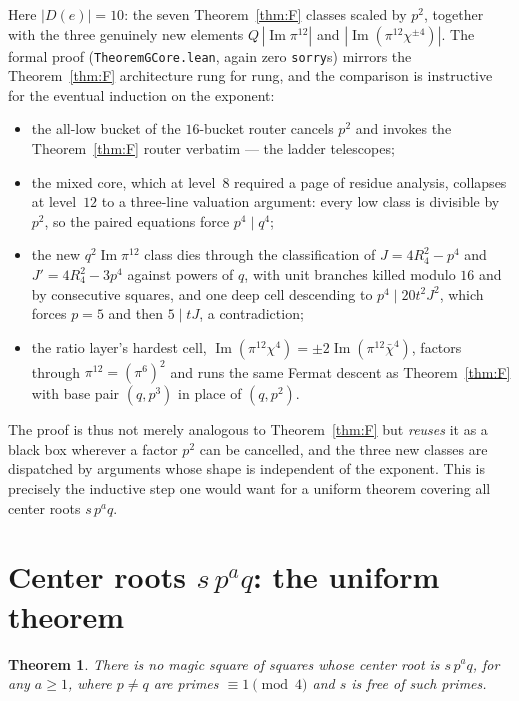 \documentclass[11pt]{article}
\newtheorem{theorem}{Theorem}
\theoremstyle{remark}
\DeclareMathOperator{\im}{Im}
\begin{document}
Here $|D(e)|=10$: the seven Theorem~\ref{thm:F} classes scaled by $p^2$,
together with the three genuinely new elements
$Q\,|\!\im\pi^{12}|$ and $|\!\im(\pi^{12}\chi^{\pm4})|$.  The formal proof
(\texttt{TheoremGCore.lean}, again zero \texttt{sorry}s) mirrors the
Theorem~\ref{thm:F} architecture rung for rung, and the comparison is
instructive for the eventual induction on the exponent:
\begin{itemize}
\item the all-low bucket of the $16$-bucket router cancels $p^2$ and invokes
the Theorem~\ref{thm:F} router verbatim --- the ladder telescopes;
\item the mixed core, which at level~$8$ required a page of residue
analysis, collapses at level~$12$ to a three-line valuation argument:
every low class is divisible by $p^2$, so the paired equations force
$p^4\mid q^4$;
\item the new $q^2\im\pi^{12}$ class dies through the classification of
$J=4R_4^2-p^4$ and $J'=4R_4^2-3p^4$ against powers of $q$, with unit
branches killed modulo $16$ and by consecutive squares, and one deep cell
descending to $p^4\mid 20t^2J^2$, which forces $p=5$ and then $5\mid tJ$,
a contradiction;
\item the ratio layer's hardest cell, $\im(\pi^{12}\chi^4)=\pm2
\im(\pi^{12}\bar\chi^4)$, factors through $\pi^{12}=(\pi^6)^2$ and runs the
same Fermat descent as Theorem~\ref{thm:F} with base pair $(q,p^3)$ in place
of $(q,p^2)$.
\end{itemize}
The proof is thus not merely analogous to Theorem~\ref{thm:F} but
\emph{reuses} it as a black box wherever a factor $p^2$ can be cancelled,
and the three new classes are dispatched by arguments whose shape is
independent of the exponent.  This is precisely the inductive step one
would want for a uniform theorem covering all center roots $s\,p^aq$.

\section{Center roots $s\,p^aq$: the uniform theorem}

\begin{theorem}\label{thm:U}
There is no magic square of squares whose center root is $s\,p^aq$, for any
$a\ge 1$, where $p\neq q$ are primes $\equiv 1\pmod 4$ and $s$ is free of
such primes.
\end{theorem}
\end{document}
